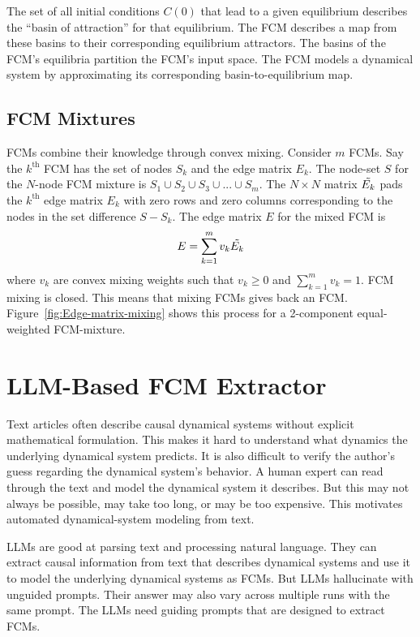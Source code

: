 \documentclass[runningheads]{llncs}
\begin{document}
The set of all initial conditions $C(0)$ that lead to a given equilibrium describes the ``basin of attraction'' for that equilibrium. 
The FCM describes a map from these basins to their corresponding equilibrium attractors. 
The basins of the FCM's equilibria partition the FCM's input space. 
The FCM models a dynamical system by approximating its corresponding basin-to-equilibrium map. 

\subsection{FCM Mixtures}

FCMs combine their knowledge through convex mixing. 
Consider $m$ FCMs. 
Say the $k^{\text{th}}$ FCM has the set of nodes $S_k$ and the edge matrix $E_k$. 
The node-set $S$ for the $N$-node FCM mixture is $S_1\cup S_2\cup S_3\cup ...\cup S_m$. 
The $N\times N$ matrix $\Tilde{E_k}$ pads the $k^{\text{th}}$ edge matrix $E_k$ with zero rows and zero columns corresponding to the nodes in the set difference $S - S_k$. 
The edge matrix $E$ for the mixed FCM is
\begin{align}
    E = \sum_{k=1}^m v_k\Tilde{E_k} \label{eg:fcm_mixing}
\end{align}
where $v_k$ are convex mixing weights such that $v_k\geq0$ and $\sum_{k=1}^mv_k=1$. 
FCM mixing is closed.
This means that mixing FCMs gives back an FCM. 
Figure~\ref{fig:Edge-matrix-mixing} shows this process for a 2-component equal-weighted FCM-mixture.

\section{LLM-Based FCM Extractor}\label{LLM-FCM-Extractor}

Text articles often describe causal dynamical systems without explicit mathematical formulation. 
This makes it hard to understand what dynamics the underlying dynamical system predicts. 
It is also difficult to verify the author's guess regarding the dynamical system's behavior. 
A human expert can read through the text and model the dynamical system it describes. 
But this may not always be possible, may take too long, or may be too expensive. 
This motivates automated dynamical-system modeling from text. 

LLMs are good at parsing text and processing natural language. 
They can extract causal information from text that describes dynamical systems and use it to model the underlying dynamical systems as FCMs. 
But LLMs hallucinate with unguided prompts. 
Their answer may also vary across multiple runs with the same prompt. 
The LLMs need guiding prompts that are designed to extract FCMs.
\end{document}

